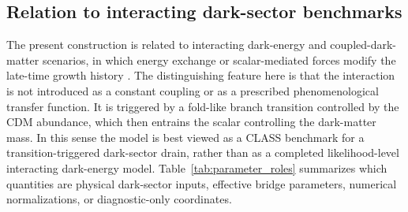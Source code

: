 ﻿\documentclass[11pt,prd,preprint,nofootinbib,amsmath,amssymb]{revtex4-2}
\begin{document}
\subsection{Relation to interacting dark-sector benchmarks}

The present construction is related to interacting dark-energy and
coupled-dark-matter scenarios, in which energy exchange or scalar-mediated
forces modify the late-time growth history
\cite{Amendola2000,Wetterich1995,Koivisto2005,Valiviita2008,Gavela2009,Bean2008}.
The distinguishing feature here is that the interaction is not introduced as a
constant coupling or as a prescribed phenomenological transfer function. It is
triggered by a fold-like branch transition controlled by the CDM abundance,
which then entrains the scalar controlling the dark-matter mass. In this sense
the model is best viewed as a CLASS benchmark for a transition-triggered
dark-sector drain, rather than as a completed likelihood-level interacting
dark-energy model.
Table~\ref{tab:parameter_roles} summarizes which quantities are physical
dark-sector inputs, effective bridge parameters, numerical normalizations, or
diagnostic-only coordinates.
\end{document}
